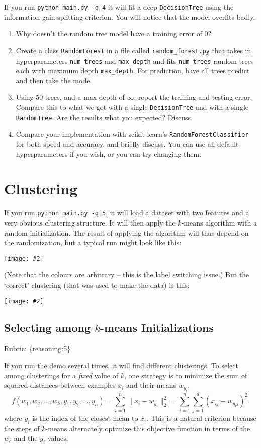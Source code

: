 \documentclass{article}
\def\rubric#1{\gre{Rubric: \{#1\}}}{}
\def\blu#1{{\color{blu}#1}}
\def\gre#1{{\color{gre}#1}}
\def\norm#1{\|#1\|}
\newcommand{\centerfig}[2]{\begin{center}\texttt{[image: \#2]}\end{center}}
\def\enum#1{\begin{enumerate}#1\end{enumerate}}
\begin{document}
If you run \texttt{python main.py -q 4} it will fit a deep \texttt{DecisionTree}
using the information gain splitting criterion. You will notice that the model overfits badly.




\blu{
\enum{
\item Why doesn't the random tree model have a training error of 0?
\item Create a class \texttt{RandomForest} in a file called \texttt{random\string_forest.py} that takes in hyperparameters \texttt{num\string_trees} and \texttt{max\string_depth} and
fits \texttt{num\string_trees} random trees each with maximum depth \texttt{max\string_depth}. For prediction, have all trees predict and then take the mode.
\item Using 50 trees, and a max depth of $\infty$, report the training and testing error. Compare this to what we got with a single \texttt{DecisionTree} and with a single \texttt{RandomTree}. Are the results what you expected? Discuss.
\item Compare your implementation with scikit-learn's \texttt{RandomForestClassifier} for both speed and accuracy, and briefly discuss. You can use all default hyperparameters if you wish, or you can try changing them.
}
}

\section{Clustering}

If you run \verb|python main.py -q 5|, it will load a dataset with two features
and a very obvious clustering structure. It will then apply the $k$-means algorithm
with a random initialization. The result of applying the
algorithm will thus depend on the randomization, but a typical run might look like this:
\centerfig{.5}{../figs/kmeans_basic.png}
(Note that the colours are arbitrary -- this is the label switching issue.)
But the `correct' clustering (that was used to make the data) is this:
\centerfig{.5}{../figs/kmeans_good.png}


\subsection{Selecting among $k$-means Initializations}
\rubric{reasoning:5}

If you run the demo several times, it will find different clusterings. To select among clusterings for a \emph{fixed} value of $k$, one strategy is to minimize the sum of squared distances between examples $x_i$ and their means $w_{y_i}$,
\[
f(w_1,w_2,\dots,w_k,y_1,y_2,\dots,y_n) = \sum_{i=1}^n \norm{x_i - w_{y_i}}_2^2 = \sum_{i=1}^n \sum_{j=1}^d (x_{ij} - w_{y_ij})^2.
\]
 where $y_i$ is the index of the closest mean to $x_i$. This is a natural criterion because the steps of $k$-means alternately optimize this objective function in terms of the $w_c$ and the $y_i$ values.
\end{document}
